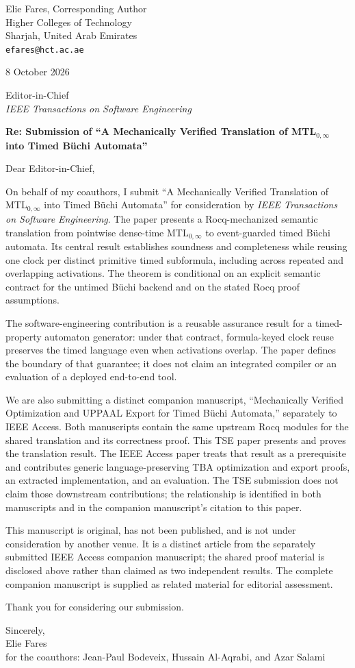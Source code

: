 \documentclass[11pt]{article}
\begin{document}
\begin{flushright}
Elie Fares, Corresponding Author\\
Higher Colleges of Technology\\
Sharjah, United Arab Emirates\\
\texttt{efares@hct.ac.ae}
\end{flushright}

8 October 2026

Editor-in-Chief\\
\emph{IEEE Transactions on Software Engineering}

\textbf{Re: Submission of ``A Mechanically Verified Translation of MTL$_{0,\infty}$ into Timed B\"uchi Automata''}

Dear Editor-in-Chief,

On behalf of my coauthors, I submit ``A Mechanically Verified Translation of MTL$_{0,\infty}$ into Timed B\"uchi Automata'' for consideration by \emph{IEEE Transactions on Software Engineering}. The paper presents a Rocq-mechanized semantic translation from pointwise dense-time MTL$_{0,\infty}$ to event-guarded timed B\"uchi automata. Its central result establishes soundness and completeness while reusing one clock per distinct primitive timed subformula, including across repeated and overlapping activations. The theorem is conditional on an explicit semantic contract for the untimed B\"uchi backend and on the stated Rocq proof assumptions.

The software-engineering contribution is a reusable assurance result for a timed-property automaton generator: under that contract, formula-keyed clock reuse preserves the timed language even when activations overlap. The paper defines the boundary of that guarantee; it does not claim an integrated compiler or an evaluation of a deployed end-to-end tool.

We are also submitting a distinct companion manuscript, ``Mechanically Verified Optimization and UPPAAL Export for Timed B\"uchi Automata,'' separately to IEEE Access. Both manuscripts contain the same upstream Rocq modules for the shared translation and its correctness proof. This TSE paper presents and proves the translation result. The IEEE Access paper treats that result as a prerequisite and contributes generic language-preserving TBA optimization and export proofs, an extracted implementation, and an evaluation. The TSE submission does not claim those downstream contributions; the relationship is identified in both manuscripts and in the companion manuscript's citation to this paper.

This manuscript is original, has not been published, and is not under consideration by another venue. It is a distinct article from the separately submitted IEEE Access companion manuscript; the shared proof material is disclosed above rather than claimed as two independent results. The complete companion manuscript is supplied as related material for editorial assessment.

Thank you for considering our submission.

Sincerely,\\[0.3em]
Elie Fares\\
for the coauthors: Jean-Paul Bodeveix, Hussain Al-Aqrabi, and Azar Salami
\end{document}
